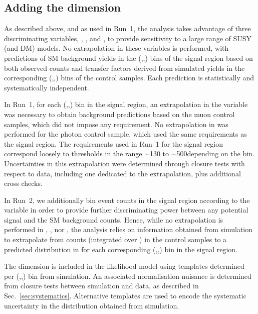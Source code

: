 \subsection{Adding the \texorpdfstring{\mht}{MHT} dimension}
\label{sec:had-shape}

As described above, and as used in Run~1, the analysis takes advantage
of three discriminating variables, \njet, \nb, and \HT, to provide
sensitivity to a large range of SUSY (and DM) models. No extrapolation
in these variables is performed, with predictions of SM background
yields in the (\njet,\nb,\HT) bins of the signal region based on both
observed counts and transfer factors derived from simulated yields in
the corresponding (\njet,\nb,\HT) bins of the control samples. Each
prediction is statistically and systematically independent.

In Run~1, for each (\njet,\nb,\HT) bin in the signal region, an
extrapolation in the variable \alphat was necessary to obtain
background predictions based on the muon control samples, which did
not impose any \alphat requirement. No extrapolation in \alphat was
performed for the photon control sample, which used the same \alphat
requirements as the signal region. The \alphat requirements used in
Run~1 for the signal region correspond loosely to \mht thresholds in
the range $\sim$130 to $\sim$500\gev depending on the \HT
bin. Uncertainties in this extrapolation were determined through
closure tests with respect to data, including one dedicated to the
\alphat extrapolation, plus additional cross checks.

In Run~2, we additionally bin event counts in the signal region
according to the variable \mht in order to provide further
discriminating power between any potential signal and the SM
background counts. Hence, while no extrapolation is performed in
\njet, \nb, nor \HT, the analysis relies on information obtained
from simulation to extrapolate from counts (integrated over \mht) in
the control samples to a predicted distribution in \mht for each
corresponding (\njet,\nb,\HT) bin in the signal region.

The \mht dimension is included in the likelihood model using templates
determined per (\njet,\nb,\HT) bin from simulation. An associated
normalisation nuisance is determined from closure tests between
simulation and data, as described in
Sec.~\ref{sec:systematics}. Alternative templates are used to encode
the systematic uncertainty in the \mht distribution obtained from
simulation. 

